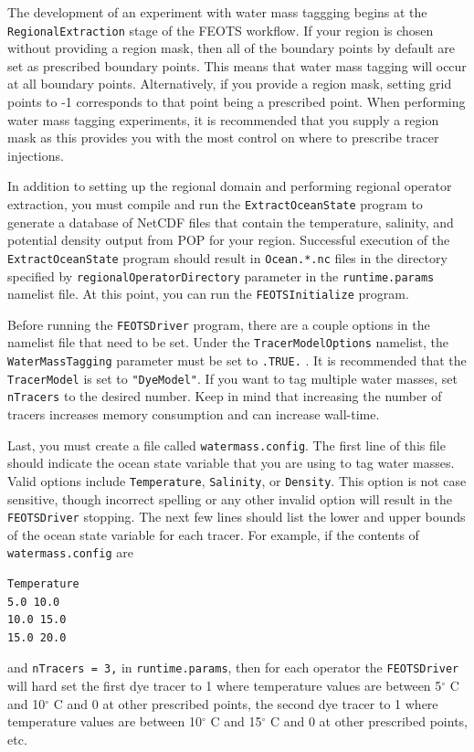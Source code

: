 \documentclass{softwaremanual}
\begin{document}
The development of an experiment with water mass taggging begins at the \texttt{RegionalExtraction} stage of the FEOTS workflow. If your region is chosen without providing a region mask, then all of the boundary points by default are set as prescribed boundary points. This means that water mass tagging will occur at all boundary points. Alternatively, if you provide a region mask, setting grid points to -1 corresponds to that point being a prescribed point. When performing water mass tagging experiments, it is recommended that you supply a region mask as this provides you with the most control on where to prescribe tracer injections.

 
In addition to setting up the regional domain and performing regional operator extraction, you must compile and run the \texttt{ExtractOceanState} program to generate a database of NetCDF files that contain the temperature, salinity, and potential density output from POP for your region. Successful execution of the \texttt{ExtractOceanState} program should result in \texttt{Ocean.*.nc} files in the directory specified by \texttt{regionalOperatorDirectory} parameter in the \texttt{runtime.params} namelist file. At this point, you can run the \texttt{FEOTSInitialize} program.

Before running the \texttt{FEOTSDriver} program, there are a couple options in the namelist file that need to be set. Under the \texttt{TracerModelOptions} namelist, the \texttt{WaterMassTagging} parameter must be set to \texttt{.TRUE.} . It is recommended that the \texttt{TracerModel} is set to \texttt{"DyeModel"}. If you want to tag multiple water masses, set \texttt{nTracers} to the desired number. Keep in mind that increasing the number of tracers increases memory consumption and can increase wall-time. 

Last, you must create a file called \texttt{watermass.config}. The first line of this file should indicate the ocean state variable that you are using to tag water masses. Valid options include \texttt{Temperature}, \texttt{Salinity}, or \texttt{Density}. This option is not case sensitive, though incorrect spelling or any other invalid option will result in the \texttt{FEOTSDriver} stopping. The next few lines should list the lower and upper bounds of the ocean state variable for each tracer. For example, if the contents of \texttt{watermass.config} are
\begin{verbatim}
Temperature
5.0 10.0
10.0 15.0
15.0 20.0
\end{verbatim}
and \texttt{nTracers = 3,} in \texttt{runtime.params}, then for each operator the \texttt{FEOTSDriver} will hard set the first dye tracer to 1 where temperature values are between 5$^\circ$ C and 10$^\circ$ C and 0 at other prescribed points, the second dye tracer to 1 where temperature values are between 10$^\circ$ C and 15$^\circ$ C and 0 at other prescribed points, etc.
\end{document}
